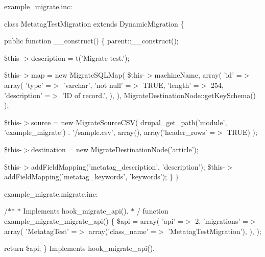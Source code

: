 example\_\-migrate.inc:

class MetatagTestMigration extends DynamicMigration \{

public function \_\-\_\-construct() \{ parent::\_\-\_\-construct();

\$this-\/$>$description = t('Migrate test.');

\$this-\/$>$map = new MigrateSQLMap( \$this-\/$>$machineName, array( 'id' =$>$ array( 'type' =$>$ 'varchar', 'not null' =$>$ TRUE, 'length' =$>$ 254, 'description' =$>$ 'ID of record.', ), ), MigrateDestinationNode::getKeySchema() );

\$this-\/$>$source = new MigrateSourceCSV( drupal\_\-get\_\-path('module', 'example\_\-migrate') . '/sample.csv', array(), array('header\_\-rows' =$>$ TRUE) );

\$this-\/$>$destination = new MigrateDestinationNode('article');

\$this-\/$>$addFieldMapping('metatag\_\-description', 'description'); \$this-\/$>$addFieldMapping('metatag\_\-keywords', 'keywords'); \} \}

example\_\-migrate.migrate.inc:

/$\ast$$\ast$ $\ast$ Implements hook\_\-migrate\_\-api(). $\ast$ / function example\_\-migrate\_\-migrate\_\-api() \{ \$api = array( 'api' =$>$ 2, 'migrations' =$>$ array( 'MetatagTest' =$>$ array('class\_\-name' =$>$ 'MetatagTestMigration'), ), );

return \$api; \} Implements hook\_\-migrate\_\-api(). 